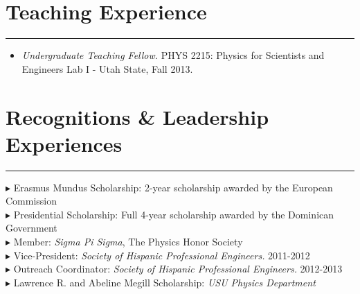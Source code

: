 \documentclass[letterpaper,10pt]{article}
\begin{document}
\section*{Teaching Experience}

\hrule
\vspace{.3 cm}


\begin{itemize}[label=$\blacktriangleright$]
  \item \emph{Undergraduate Teaching Fellow.}  PHYS 2215: Physics for Scientists and Engineers Lab I -  Utah State, Fall 2013.
  \end{itemize}


\section*{Recognitions \& Leadership Experiences }       

\hrule
\vspace{.3 cm}

\hangindent=0.4cm  
 \hspace{.3 cm}  $\blacktriangleright$  Erasmus Mundus Scholarship: 2-year scholarship awarded by the European Commission  \\    
 \hspace{.2 cm}    $\blacktriangleright$  Presidential Scholarship: Full 4-year scholarship awarded by the Dominican Government \\    
\hspace{.2 cm}   $\blacktriangleright$  Member: \emph{Sigma Pi Sigma}, The Physics Honor Society  \\   
\hspace{.2 cm}   $\blacktriangleright$  Vice-President: \emph{Society of Hispanic Professional Engineers.} 2011-2012\\
\hspace{.2 cm}   $\blacktriangleright$  Outreach Coordinator: \emph{Society of Hispanic Professional Engineers.} 2012-2013 \\  
\hspace{.2 cm}   $\blacktriangleright$   Lawrence  R. and Abeline Megill Scholarship: \emph{USU Physics Department}   %
\end{document}
